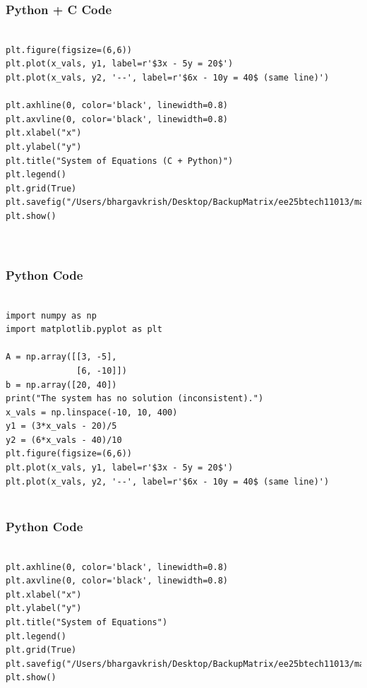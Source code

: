 \documentclass{beamer}
\begin{document}
\begin{frame}[fragile]
    \frametitle{Python + C Code}
    \begin{lstlisting}

plt.figure(figsize=(6,6))
plt.plot(x_vals, y1, label=r'$3x - 5y = 20$')
plt.plot(x_vals, y2, '--', label=r'$6x - 10y = 40$ (same line)')

plt.axhline(0, color='black', linewidth=0.8)
plt.axvline(0, color='black', linewidth=0.8)
plt.xlabel("x")
plt.ylabel("y")
plt.title("System of Equations (C + Python)")
plt.legend()
plt.grid(True)
plt.savefig("/Users/bhargavkrish/Desktop/BackupMatrix/ee25btech11013/matgeo/5.2.16/figs/Figure_1.png")
plt.show()



    \end{lstlisting}
\end{frame}

\begin{frame}[fragile]
    \frametitle{Python Code}
    \begin{lstlisting}

import numpy as np
import matplotlib.pyplot as plt

A = np.array([[3, -5],
              [6, -10]])
b = np.array([20, 40])
print("The system has no solution (inconsistent).")
x_vals = np.linspace(-10, 10, 400)
y1 = (3*x_vals - 20)/5
y2 = (6*x_vals - 40)/10
plt.figure(figsize=(6,6))
plt.plot(x_vals, y1, label=r'$3x - 5y = 20$')
plt.plot(x_vals, y2, '--', label=r'$6x - 10y = 40$ (same line)')


    \end{lstlisting}
\end{frame}

\begin{frame}[fragile]
    \frametitle{Python Code}
    \begin{lstlisting}

plt.axhline(0, color='black', linewidth=0.8)
plt.axvline(0, color='black', linewidth=0.8)
plt.xlabel("x")
plt.ylabel("y")
plt.title("System of Equations")
plt.legend()
plt.grid(True)
plt.savefig("/Users/bhargavkrish/Desktop/BackupMatrix/ee25btech11013/matgeo/5.2.16/figs/Figure_1.png")
plt.show()



    \end{lstlisting}
\end{frame}
\end{document}
